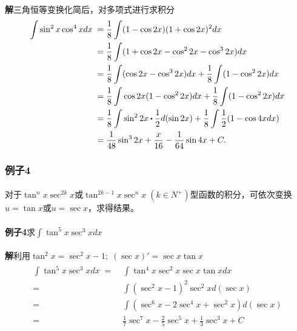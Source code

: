 \paragraph{}
\textbf{解\;}三角恒等变换化简后，对多项式进行求积分
\begin{align*}
\begin{split}
  \int\sin^2x\cos^4xdx \;=&\; \frac{1}{8}\int(1-\cos{2x})(1+\cos{2x})^2dx \\
  =&\; \frac{1}{8} \int (1+\cos{2x} - \cos^2{2x} - \cos^3{2x})dx \\
  =&\; \frac{1}{8} \int (\cos{2x} - \cos^3{2x})dx + \frac{1}{8} \int (1 - \cos^2{2x})dx \\
  =&\; \frac{1}{8} \int \cos{2x}(1 - \cos^2{2x})dx + \frac{1}{8} \int (1 - \cos^2{2x})dx \\
  =&\; \frac{1}{8} \int \sin^2{2x} \bigcdot \frac{1}{2}d(\sin{2x}) + \frac{1}{8} \int \frac{1}{2} (1-\cos{4x}dx) \\
  =&\; \frac{1}{48} \sin^3{2x} + \frac{x}{16} - \frac{1}{64} \sin{4x} + C.
\end{split}
\end{align*}

\subsubsection{例子4}
\paragraph{}
对于$\tan^nx\sec^{2k}x$或$\tan^{2k-1}x\sec^nx \; (k \in N^+)$型函数的积分，可依次变换$u=\tan{x}$或$u=\sec{x}$，求得结果。

\paragraph{}
\textbf{例子4\;}求$\displaystyle\int\tan^5x\sec^3xdx$

\paragraph{}
\textbf{解\;}利用$\tan^2x = \sec^2x-1; \; (\sec{x})' = \sec{x}\tan{x}$
\begin{align*}
\begin{split}
  \int\tan^5x\sec^3xdx \;=&\; \int\tan^4x\sec^2x\sec{x}\tan{x}dx \\
  =&\; \int(\sec^2x-1)^2\sec^2xd(\sec{x}) \\
  =&\; \int(\sec^6x-2\sec^4x+\sec^2x)d(\sec{x}) \\
  =&\; \frac{1}{7}\sec^7x - \frac{2}{5}\sec^5x + \frac{1}{3}\sec^3x + C
\end{split}
\end{align*}


